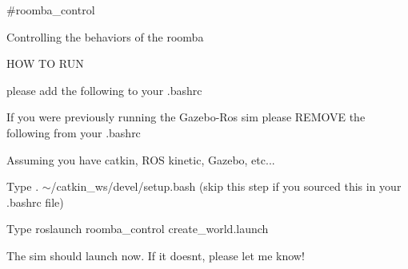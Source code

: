 \#roomba\+\_\+control

Controlling the behaviors of the roomba

H\+OW TO R\+UN

please add the following to your .bashrc 
\begin{DoxyCode}{0}
\end{DoxyCode}



\begin{DoxyCode}{0}
\end{DoxyCode}


If you were previously running the Gazebo-\/\+Ros sim please R\+E\+M\+O\+VE the following from your .bashrc 
\begin{DoxyCode}{0}
\end{DoxyCode}


Assuming you have catkin, R\+OS kinetic, Gazebo, etc...


\begin{DoxyEnumerate}
\item Type . $\sim$/catkin\+\_\+ws/devel/setup.bash (skip this step if you sourced this in your .bashrc file)
\item Type roslaunch roomba\+\_\+control create\+\_\+world.\+launch
\item The sim should launch now. If it doesn\textquotesingle{}t, please let me know! 
\end{DoxyEnumerate}